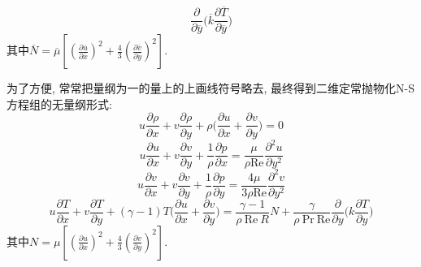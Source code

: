 \begin{solution}
\begin{itemize}
\[\frac{\partial}{\partial\overline{y}}
\Big(\overline{k}\frac{\partial\overline{T}}{\partial\overline{y}}\Big)
\]
其中$\overline{N}=\overline{\mu}
[(\frac{\partial\overline{u}}{\partial\overline{x}})^{2}
+\frac{4}{3}(\frac{\partial\overline{v}}{\partial\overline{y}})^{2}]$.
\end{itemize}
为了方便, 常常把量纲为一的量上的上画线符号略去, 最终得到二维定常抛物化N-S方程组的无量纲形式:
\[
{u}\frac{\partial{\rho}}{\partial{x}}+{v}\frac{\partial{\rho}}{\partial{y}}+{\rho}\Big(\frac{\partial{u}}{\partial{x}}+\frac{\partial{v}}{\partial{y}}\Big)=0
\]
\[
{u}\frac{\partial{u}}{\partial{x}}+{v}\frac{\partial{v}}{\partial{y}}+\frac{1}{{\rho}}\frac{\partial{p}}{\partial{x}}
=\frac{{\mu}}{{\rho}\textrm{Re}}\frac{\partial^{2}{u}}{\partial{y}^2}
\]
\[
{u}\frac{\partial{v}}{\partial{x}}
+{v}\frac{\partial{v}}{\partial{y}}
+\frac{1}{{\rho}}\frac{\partial{p}}{\partial{y}}
=\frac{4{\mu}}{{3\rho}\textrm{Re}}\frac{\partial^{2}{v}}{\partial{y}^2}
\]
\[
{u}\frac{\partial{T}}{\partial{x}}
+{v}\frac{\partial{T}}{\partial{y}}
+(\gamma-1){T}\Big(\frac{\partial{u}}{\partial{x}}
+\frac{\partial{v}}{\partial{y}}\Big)
=
\frac{\gamma-1}{{\rho}~\textrm{Re}~{R}}
{N}+
\frac{\gamma}{{\rho}~\textrm{Pr}~\textrm{Re}}
\frac{\partial}{\partial{y}}
\Big({k}\frac{\partial{T}}{\partial{y}}\Big)
\]
其中${N}={\mu}
[(\frac{\partial{u}}{\partial{x}})^{2}
+\frac{4}{3}(\frac{\partial{v}}{\partial{y}})^{2}]$.
\end{solution} 
